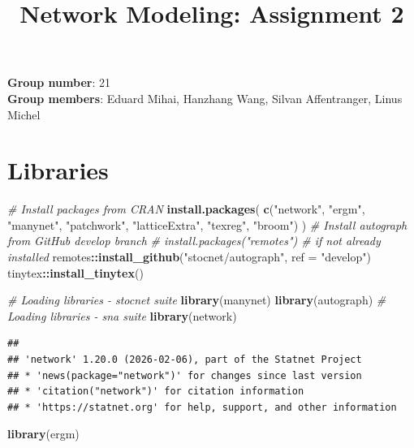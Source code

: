 \documentclass[
]{article}
\title{Network Modeling: Assignment 2}
\author{}
\date{\vspace{-2.5em}}
\newenvironment{Shaded}{\begin{snugshade}}{\end{snugshade}}
\newcommand{\AttributeTok}[1]{\textcolor[rgb]{0.13,0.29,0.53}{#1}}
\newcommand{\CommentTok}[1]{\textcolor[rgb]{0.56,0.35,0.01}{\textit{#1}}}
\newcommand{\FunctionTok}[1]{\textcolor[rgb]{0.13,0.29,0.53}{\textbf{#1}}}
\newcommand{\NormalTok}[1]{#1}
\newcommand{\SpecialCharTok}[1]{\textcolor[rgb]{0.81,0.36,0.00}{\textbf{#1}}}
\newcommand{\StringTok}[1]{\textcolor[rgb]{0.31,0.60,0.02}{#1}}
\begin{document}
\maketitle

\textbf{Group number}: 21\\
\textbf{Group members}: Eduard Mihai, Hanzhang Wang, Silvan
Affentranger, Linus Michel

\section{Libraries}\label{libraries}

\begin{Shaded}
\begin{Highlighting}[]
\CommentTok{\# Install packages from CRAN}
\FunctionTok{install.packages}\NormalTok{(}
\FunctionTok{c}\NormalTok{(}\StringTok{"network"}\NormalTok{, }\StringTok{"ergm"}\NormalTok{, }\StringTok{"manynet"}\NormalTok{, }\StringTok{"patchwork"}\NormalTok{, }\StringTok{"latticeExtra"}\NormalTok{, }\StringTok{"texreg"}\NormalTok{, }\StringTok{"broom"}\NormalTok{)}
\NormalTok{)}
\CommentTok{\# Install autograph from GitHub develop branch}
\CommentTok{\# install.packages("remotes") \# if not already installed}
\NormalTok{remotes}\SpecialCharTok{::}\FunctionTok{install\_github}\NormalTok{(}\StringTok{"stocnet/autograph"}\NormalTok{, }\AttributeTok{ref =} \StringTok{"develop"}\NormalTok{)}
\NormalTok{tinytex}\SpecialCharTok{::}\FunctionTok{install\_tinytex}\NormalTok{()}
\end{Highlighting}
\end{Shaded}

\begin{Shaded}
\begin{Highlighting}[]
\CommentTok{\# Loading libraries {-} stocnet suite}
\FunctionTok{library}\NormalTok{(manynet)}
\FunctionTok{library}\NormalTok{(autograph)}
\CommentTok{\# Loading libraries {-} sna suite}
\FunctionTok{library}\NormalTok{(network)}
\end{Highlighting}
\end{Shaded}

\begin{verbatim}
## 
## 'network' 1.20.0 (2026-02-06), part of the Statnet Project
## * 'news(package="network")' for changes since last version
## * 'citation("network")' for citation information
## * 'https://statnet.org' for help, support, and other information
\end{verbatim}

\begin{Shaded}
\begin{Highlighting}[]
\FunctionTok{library}\NormalTok{(ergm)}
\end{Highlighting}
\end{Shaded}
\end{document}
